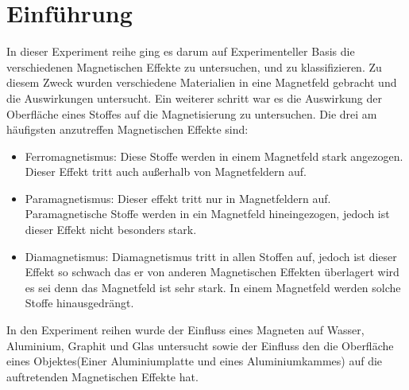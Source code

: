\section{Einführung}
In dieser Experiment reihe ging es darum auf Experimenteller Basis die verschiedenen Magnetischen Effekte zu untersuchen,
und zu klassifizieren. Zu diesem Zweck wurden verschiedene Materialien in eine Magnetfeld gebracht und die Auswirkungen untersucht. 
Ein weiterer schritt war es die Auswirkung der Oberfläche eines Stoffes auf die Magnetisierung zu untersuchen.
Die drei am häufigsten anzutreffen Magnetischen Effekte sind:
\begin{itemize}
	\item Ferromagnetismus: Diese Stoffe werden in einem Magnetfeld stark angezogen.
	Dieser Effekt tritt auch außerhalb von Magnetfeldern auf.
	\item Paramagnetismus: Dieser effekt tritt nur in Magnetfeldern auf. Paramagnetische Stoffe werden in ein Magnetfeld hineingezogen, jedoch ist dieser Effekt nicht besonders stark.
	\item Diamagnetismus: Diamagnetismus tritt in allen Stoffen auf, jedoch ist dieser Effekt so schwach das er von anderen Magnetischen Effekten überlagert wird es sei denn das Magnetfeld ist sehr stark.
	In einem Magnetfeld werden solche Stoffe hinausgedrängt.
\end{itemize}
In den Experiment reihen wurde der Einfluss eines Magneten auf Wasser, Aluminium, Graphit und Glas untersucht sowie der Einfluss den die Oberfläche eines Objektes(Einer Aluminiumplatte und eines Aluminiumkammes) auf
die auftretenden Magnetischen Effekte hat.